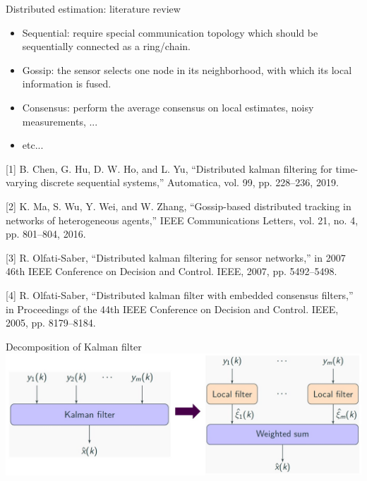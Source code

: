 \documentclass[10pt]{beamer}
\DeclareMathOperator{\1}{\textbf{1}}
\begin{document}
	  \begin{frame}{Distributed estimation: literature review}
	    \begin{itemize}
	      \item Sequential: require special communication topology which should be sequentially connected as a ring/chain.
	      \item Gossip: the sensor selects one node in its neighborhood, with which its local information is fused.
	      \item Consensus: perform the average consensus on local estimates, noisy measurements, ... 
	      \item etc...
	    \end{itemize}
	    {\scriptsize [1] B. Chen, G. Hu, D. W. Ho, and L. Yu, ``Distributed kalman filtering
	      for time-varying discrete sequential systems,” Automatica, vol. 99, pp.
	      228–236, 2019.

	      [2] K. Ma, S. Wu, Y. Wei, and W. Zhang, ``Gossip-based distributed tracking
	      in networks of heterogeneous agents,” IEEE Communications Letters,
	      vol. 21, no. 4, pp. 801–804, 2016.

	      [3] R. Olfati-Saber, ``Distributed kalman filtering for sensor networks,” in
	      2007 46th IEEE Conference on Decision and Control. IEEE, 2007, pp.
	      5492–5498.

	      [4] R. Olfati-Saber, ``Distributed kalman filter with embedded consensus filters,” in
	      Proceedings of the 44th IEEE Conference on Decision and Control.
	      IEEE, 2005, pp. 8179–8184.

	    }
	  \end{frame}

	  \begin{frame}{Decomposition of Kalman filter}
	    \centering
	    \includegraphics[width=1.0\textwidth]{pic/decomp}
	  \end{frame}
\end{document}

